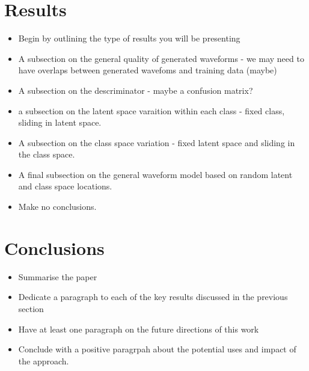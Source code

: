 \documentclass[%
 reprint,
 amsmath,amssymb,
 aps,
]{revtex4-2}
\begin{document}
\section{Results}

\begin{itemize}
\item Begin by outlining the type of results you will be presenting
\item A subsection on the general quality of generated waveforms - we may need
to have overlaps between generated wavefoms and training data (maybe)
\item A subsection on the descriminator - maybe a confusion matrix?
\item a subsection on the latent space varaition within each class - fixed
class, sliding in latent space.
\item A subsection on the class space variation - fixed latent space and
sliding in the class space.
\item A final subsection on the general waveform model based on random latent
and class space locations.
\item Make no conclusions.
\end{itemize}

\section{Conclusions}

\begin{itemize}
\item Summarise the paper
\item Dedicate a paragraph to each of the key results discussed in the previous
section
\item Have at least one paragraph on the future directions of this work
\item Conclude with a positive paragrpah about the potential uses and impact of
the approach.
\end{itemize}

\end{document}
